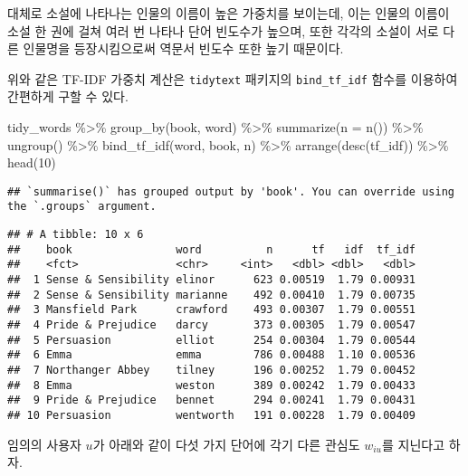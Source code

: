 \documentclass[
]{book}
\newenvironment{Shaded}{\begin{snugshade}}{\end{snugshade}}
\newcommand{\AttributeTok}[1]{\textcolor[rgb]{0.77,0.63,0.00}{#1}}
\newcommand{\DecValTok}[1]{\textcolor[rgb]{0.00,0.00,0.81}{#1}}
\newcommand{\FunctionTok}[1]{\textcolor[rgb]{0.00,0.00,0.00}{#1}}
\newcommand{\NormalTok}[1]{#1}
\newcommand{\SpecialCharTok}[1]{\textcolor[rgb]{0.00,0.00,0.00}{#1}}
\begin{document}
대체로 소설에 나타나는 인물의 이름이 높은 가중치를 보이는데, 이는 인물의 이름이 소설 한 권에 걸쳐 여러 번 나타나 단어 빈도수가 높으며, 또한 각각의 소설이 서로 다른 인물명을 등장시킴으로써 역문서 빈도수 또한 높기 때문이다.

위와 같은 TF-IDF 가중치 계산은 \texttt{tidytext} 패키지의 \texttt{bind\_tf\_idf} 함수를 이용하여 간편하게 구할 수 있다.

\begin{Shaded}
\begin{Highlighting}[]
\NormalTok{tidy\_words }\SpecialCharTok{\%\textgreater{}\%}
  \FunctionTok{group\_by}\NormalTok{(book, word) }\SpecialCharTok{\%\textgreater{}\%}
  \FunctionTok{summarize}\NormalTok{(}\AttributeTok{n =} \FunctionTok{n}\NormalTok{()) }\SpecialCharTok{\%\textgreater{}\%}
  \FunctionTok{ungroup}\NormalTok{() }\SpecialCharTok{\%\textgreater{}\%}
  \FunctionTok{bind\_tf\_idf}\NormalTok{(word, book, n) }\SpecialCharTok{\%\textgreater{}\%}
  \FunctionTok{arrange}\NormalTok{(}\FunctionTok{desc}\NormalTok{(tf\_idf)) }\SpecialCharTok{\%\textgreater{}\%}
  \FunctionTok{head}\NormalTok{(}\DecValTok{10}\NormalTok{)}
\end{Highlighting}
\end{Shaded}

\begin{verbatim}
## `summarise()` has grouped output by 'book'. You can override using the `.groups` argument.
\end{verbatim}

\begin{verbatim}
## # A tibble: 10 x 6
##    book                word          n      tf   idf  tf_idf
##    <fct>               <chr>     <int>   <dbl> <dbl>   <dbl>
##  1 Sense & Sensibility elinor      623 0.00519  1.79 0.00931
##  2 Sense & Sensibility marianne    492 0.00410  1.79 0.00735
##  3 Mansfield Park      crawford    493 0.00307  1.79 0.00551
##  4 Pride & Prejudice   darcy       373 0.00305  1.79 0.00547
##  5 Persuasion          elliot      254 0.00304  1.79 0.00544
##  6 Emma                emma        786 0.00488  1.10 0.00536
##  7 Northanger Abbey    tilney      196 0.00252  1.79 0.00452
##  8 Emma                weston      389 0.00242  1.79 0.00433
##  9 Pride & Prejudice   bennet      294 0.00241  1.79 0.00431
## 10 Persuasion          wentworth   191 0.00228  1.79 0.00409
\end{verbatim}

임의의 사용자 \(u\)가 아래와 같이 다섯 가지 단어에 각기 다른 관심도 \(w_{iu}\)를 지닌다고 하자.
\end{document}
